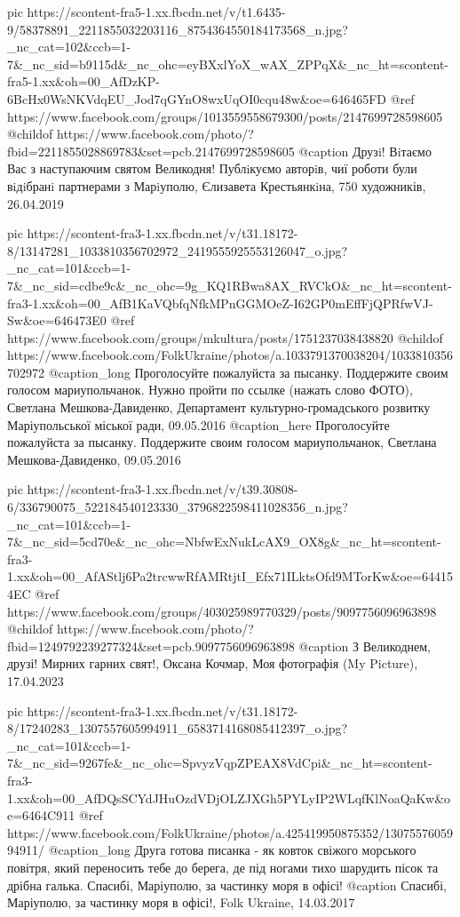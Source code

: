      pic https://scontent-fra5-1.xx.fbcdn.net/v/t1.6435-9/58378891_2211855032203116_8754364550184173568_n.jpg?_nc_cat=102&ccb=1-7&_nc_sid=b9115d&_nc_ohc=eyBXxlYoX_wAX_ZPPqX&_nc_ht=scontent-fra5-1.xx&oh=00_AfDzKP-6BcHx0WsNKVdqEU_Jod7qGYnO8wxUqOI0cqu48w&oe=646465FD
     @ref https://www.facebook.com/groups/1013559558679300/posts/2147699728598605
     @childof https://www.facebook.com/photo/?fbid=2211855028869783&set=pcb.2147699728598605
     @caption Друзi! Вiтаємо Вас з наступаючим святом Великодня! Публiкуємо авторiв, чиї роботи були вiдiбранi партнерами з Марiуполю,  Єлизавета  Крестьянкiна, 750 художників, 26.04.2019 

     pic https://scontent-fra3-1.xx.fbcdn.net/v/t31.18172-8/13147281_1033810356702972_2419555925553126047_o.jpg?_nc_cat=101&ccb=1-7&_nc_sid=cdbe9c&_nc_ohc=9g_KQ1RBwa8AX_RVCkO&_nc_ht=scontent-fra3-1.xx&oh=00_AfB1KaVQbfqNfkMPnGGMOeZ-I62GP0mEffFjQPRfwVJ-Sw&oe=646473E0
     @ref https://www.facebook.com/groups/mkultura/posts/1751237038438820
     @childof https://www.facebook.com/FolkUkraine/photos/a.1033791370038204/1033810356702972
     @caption_long Проголосуйте пожалуйста за пысанку. Поддержите своим голосом мариупольчанок. Нужно пройти по ссылке (нажать слово ФОТО), Светлана Мешкова-Давиденко, Департамент культурно-громадського розвитку Маріупольської міської ради, 09.05.2016
     @caption_here Проголосуйте пожалуйста за пысанку. Поддержите своим голосом мариупольчанок, Светлана Мешкова-Давиденко, 09.05.2016

     pic https://scontent-fra3-1.xx.fbcdn.net/v/t39.30808-6/336790075_522184540123330_3796822598411028356_n.jpg?_nc_cat=101&ccb=1-7&_nc_sid=5cd70e&_nc_ohc=NbfwExNukLcAX9_OX8g&_nc_ht=scontent-fra3-1.xx&oh=00_AfAStlj6Pa2trcwwRfAMRtjtI_Efx71ILktsOfd9MTorKw&oe=644154EC
     @ref https://www.facebook.com/groups/403025989770329/posts/9097756096963898
     @childof https://www.facebook.com/photo/?fbid=1249792239277324&set=pcb.9097756096963898
     @caption З Великоднем, друзі! Мирних гарних свят!, Оксана Кочмар, Моя фотографія (My Picture), 17.04.2023


     pic https://scontent-fra3-1.xx.fbcdn.net/v/t31.18172-8/17240283_1307557605994911_6583714168085412397_o.jpg?_nc_cat=101&ccb=1-7&_nc_sid=9267fe&_nc_ohc=SpvyzVqpZPEAX8VdCpi&_nc_ht=scontent-fra3-1.xx&oh=00_AfDQsSCYdJHuOzdVDjOLZJXGh5PYLyIP2WLqfKlNoaQaKw&oe=6464C911
     @ref https://www.facebook.com/FolkUkraine/photos/a.425419950875352/1307557605994911/
     @caption_long Друга готова писанка - як ковток свіжого морського повітря, який переносить тебе до берега, де під ногами тихо шарудить пісок та дрібна галька. Спасибі, Маріуполю, за частинку моря в офісі!
     @caption Спасибі, Маріуполю, за частинку моря в офісі!, Folk Ukraine, 14.03.2017

